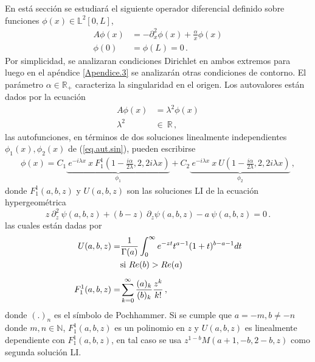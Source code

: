 En está sección se estudiará el siguiente operador diferencial definido sobre funciones $\phi (x)\in \mathbb{L} ^2 [0,L]$,
\begin{equation}
\begin{aligned}
    A \phi (x) &= - \partial ^2 _x  \phi(x) + \frac{\alpha}{x} \phi(x) \\[5pt]
    \phi(0) &= \phi(L) = 0 \, .
\end{aligned}
\label{operador}
\end{equation}
Por simplicidad, se analizaran condiciones Dirichlet en ambos extremos para luego en el apéndice \ref{Apendice.3} se analizarán otras condiciones de contorno. El parámetro $\alpha \in \mathbb{R _{+}}$ caracteriza la singularidad en el origen.
Los autovalores están dados por la ecuación 
\begin{equation}
\begin{aligned}
    A  \phi (x)  &=   \lambda ^2 \phi (x) \\[5pt]
    \lambda ^2 \ &\in \ \mathbb{R}  
    \, ,
\end{aligned}
\label{eq.aut.sin}
\end{equation}
las autofunciones, en términos de dos soluciones linealmente independientes $\phi _1 (x), \phi _2 (x)$ de (\ref{eq.aut.sin}), pueden escribirse
\begin{equation}
\begin{aligned}
    \phi (x) =
	    C _1
    	\underbrace{
				     \ e ^{-i \lambda x} \ x \ 
				     F _{1} ^{1} 
				     		\left(  
				     			1 - \frac{i \alpha}
				     			{2\lambda}
				     		,2,2 i \lambda x \right) 
				     } _ {\phi_1} + 
      C _2 
      \underbrace{ 
      			   \ e^{-i \lambda x } \ x \ 
      			   U 
      			   	\left( 
      			   		1- \frac{i \alpha}{2 \lambda}
      			   		,2,2 i \lambda x \right) } _{\phi_2} 
    \, ,
\end{aligned}
\label{eq.phi}
\end{equation}
donde $F _1 ^1(a,b,z)$ y $ U(a,b,z)$ son las soluciones LI de la ecuación {\mbox{hypergeométrica} }
\begin{equation}
    z \ \partial ^2 _z \ \psi (a,b,z) + (b-z) \
    \partial _z \psi (a,b,z)
    -a \ \psi (a,b,z) = 0 \, .
\end{equation}
las cuales están dadas por \cite{Abramowitz:hyper}
\begin{align}
	U(a,b,z) = &\frac{1}{\Gamma (a)} 
	\int _0 ^{\infty} e ^{-zt}
	t ^{a-1}
	(1+t) ^{b-a-1}
	dt \\
	& {\rm si \ } Re (b) > Re(a) 
	\nonumber
	\\[5pt]
	F _1 ^1 (a,b,z) =& \sum _ {k=0} ^{\infty} 
	\frac{(a) _k}{(b) _k} 
	\frac{z ^k}{k!} 
	\, ,
\end{align}
donde $(.) _n$ es el símbolo de Pochhammer.
Si se cumple que  $a=-m,b \neq -n$ donde $ m,n \in \mathbb{N}$, $F _1 ^1 (a,b,z)$ es un polinomio en $z$ y $U(a,b,z)$ es linealmente dependiente con $F _1 ^1 (a,b,z)$, en tal caso se usa $z^{1-b} M(a+1,-b,2-b,z)$ como segunda solución LI.


